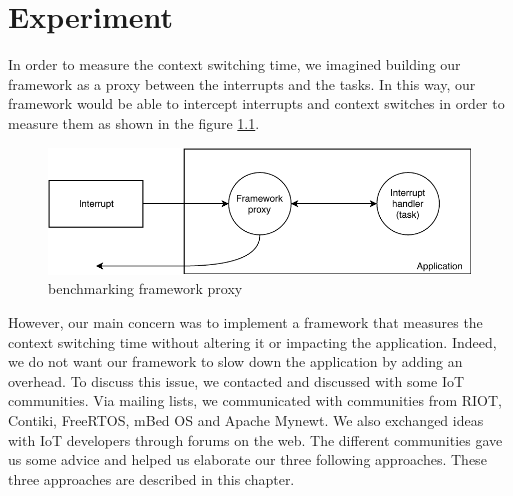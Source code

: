 \chapter{Experiment \label{chap:experiment}}

In order to measure the context switching time, we imagined building our framework as a proxy between the interrupts and the tasks.
In this way, our framework would be able to intercept interrupts and context switches in order to measure them as shown in the figure \ref{fig:proxy-framework}.

\begin{figure}[!ht]
  \centering
  \includegraphics[scale=1]{assets/proxy-framework.pdf}
  \caption{benchmarking framework proxy\label{fig:proxy-framework}}
\end{figure}


However, our main concern was to implement a framework that measures the context switching time without altering it or impacting the application.
Indeed, we do not want our framework to slow down the application by adding an overhead.
To discuss this issue, we contacted and discussed with some IoT communities.
Via mailing lists, we communicated with communities from RIOT, Contiki, FreeRTOS, mBed OS and Apache Mynewt.
We also exchanged ideas with IoT developers through forums on the web.
The different communities gave us some advice and helped us elaborate our three following approaches.
These three approaches are described in this chapter.



